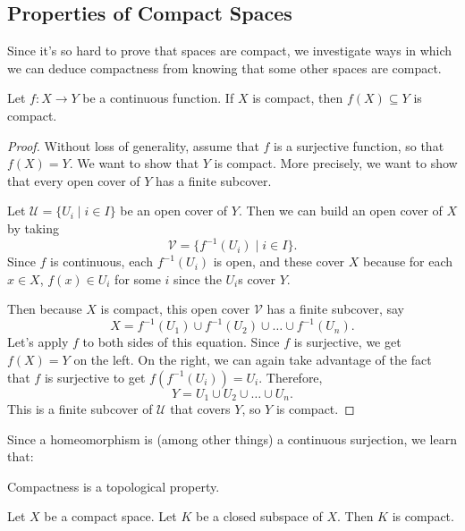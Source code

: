 \documentclass[noname]{notes}
\begin{document}
\subsection{Properties of Compact Spaces}

Since it's so hard to prove that spaces are compact, we investigate ways in which we can deduce compactness from knowing that some other spaces are compact. 

\begin{proposition}
\label{continuous image of compact is compact}
	Let $f \colon X \to Y$ be a continuous function. If $X$ is compact, then $f(X) \subseteq Y$ is compact. 
\end{proposition}

\begin{proof}
	Without loss of generality, assume that $f$ is a surjective function, so that $f(X) = Y$. We want to show that $Y$ is compact. More precisely, we want to show that every open cover of $Y$ has a finite subcover. 
	
	Let $\mathcal U = \{U_i \mid i \in I\}$ be an open cover of $Y$. Then we can build an open cover of $X$ by taking 
	\[
		\mathcal V = \{f^{-1}(U_i) \mid i \in I\}. 
	\]
	Since $f$ is continuous, each $f^{-1}(U_i)$ is open, and these cover $X$ because for each $x \in X$, $f(x) \in U_i$ for some $i$ since the $U_i$s cover $Y$. 
	
	Then because $X$ is compact, this open cover $\mathcal V$ has a finite subcover, say 
	\[
		X = f^{-1}(U_1) \cup f^{-1}(U_2) \cup \ldots \cup f^{-1}(U_n). 
	\]
	Let's apply $f$ to both sides of this equation. Since $f$ is surjective, we get $f(X) = Y$ on the left. On the right, we can again take advantage of the fact that $f$ is surjective to get $f(f^{-1}(U_i)) = U_i$. Therefore, 
	\[
		Y = U_1 \cup U_2 \cup \ldots \cup U_n. 
	\]
	This is a finite subcover of $\mathcal U$ that covers $Y$, so $Y$ is compact. 
\end{proof}

Since a homeomorphism is (among other things) a continuous surjection, we learn that:

\begin{corollary}
	Compactness is a topological property. 
\end{corollary}

\begin{proposition}
	\label{closed subspaces of compact are compact}
	Let $X$ be a compact space. Let $K$ be a closed subspace of $X$. Then $K$ is compact. 	
\end{proposition}
\end{document}
